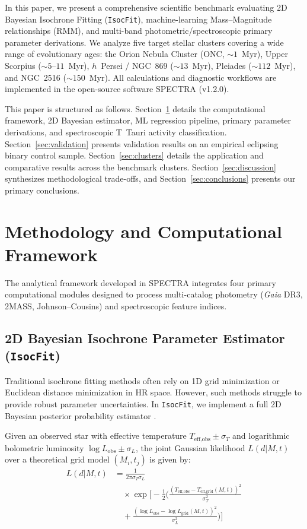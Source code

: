 \documentclass[preprints,article,submit,moreauthors,pdftex]{Definitions/mdpi}
\begin{document}
In this paper, we present a comprehensive scientific benchmark evaluating 2D Bayesian Isochrone Fitting (\texttt{IsocFit}), machine-learning Mass--Magnitude relationships (RMM), and multi-band photometric/spectroscopic primary parameter derivations. We analyze five target stellar clusters covering a wide range of evolutionary ages: the Orion Nebula Cluster (ONC, $\sim 1$~Myr), Upper Scorpius ($\sim 5\text{--}11$~Myr), $h$~Persei / NGC~869 ($\sim 13$~Myr), Pleiades ($\sim 112$~Myr), and NGC~2516 ($\sim 150$~Myr). All calculations and diagnostic workflows are implemented in the open-source software \textsc{SPECTRA} (v1.2.0).

This paper is structured as follows. Section~\ref{sec:methods} details the computational framework, 2D Bayesian estimator, ML regression pipeline, primary parameter derivations, and spectroscopic T~Tauri activity classification. Section~\ref{sec:validation} presents validation results on an empirical eclipsing binary control sample. Section~\ref{sec:clusters} details the application and comparative results across the benchmark clusters. Section~\ref{sec:discussion} synthesizes methodological trade-offs, and Section~\ref{sec:conclusions} presents our primary conclusions.


\section{Methodology and Computational Framework}
\label{sec:methods}

The analytical framework developed in \textsc{SPECTRA} integrates four primary computational modules designed to process multi-catalog photometry (\textit{Gaia} DR3, 2MASS, Johnson--Cousins) and spectroscopic feature indices.

\subsection{2D Bayesian Isochrone Parameter Estimator (\texttt{IsocFit})}
\label{sec:bayesian}

Traditional isochrone fitting methods often rely on 1D grid minimization or Euclidean distance minimization in HR space. However, such methods struggle to provide robust parameter uncertainties. In \texttt{IsocFit}, we implement a full 2D Bayesian posterior probability estimator \citep{serenelli2021weighing}.

Given an observed star with effective temperature $T_{\text{eff,obs}} \pm \sigma_T$ and logarithmic bolometric luminosity $\log L_{\text{obs}} \pm \sigma_L$, the joint Gaussian likelihood $L(d | M, t)$ over a theoretical grid model $(M_i, t_j)$ is given by:
\begin{equation}
\begin{split}
    L(d | M, t) &= \frac{1}{2\pi \sigma_T \sigma_L} \\
    &\quad \times \exp \Bigg[ -\frac{1}{2} \Bigg( \frac{(T_{\text{eff,obs}} - T_{\text{eff,grid}}(M,t))^2}{\sigma_T^2} \\
    &\quad + \frac{(\log L_{\text{obs}} - \log L_{\text{grid}}(M,t))^2}{\sigma_L^2} \Bigg) \Bigg]
\end{split}
\label{eq:likelihood}
\end{equation}
\end{document}

